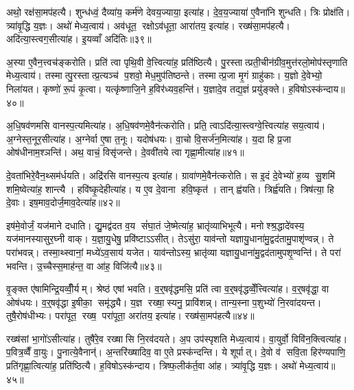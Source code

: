 अथो॒ रक्ष॑सा॒मप॑हत्यै। शुन्ध॑ध्वं॒ दैव्या॑य॒ कर्म॑णे देवय॒ज्याया॒ इत्या॑ह। दे॒व॒य॒ज्याया॑ ए॒वैना॑नि शुन्धति। त्रिः प्रोक्ष॑ति। त्र्या॑वृ॒द्धि य॒ज्ञः। अथो॑ मेध्य॒त्वाय॑। अव॑धूत॒ रक्षोऽव॑धूता॒ आरा॑तय॒ इत्या॑ह। रख्ष॑सा॒मप॑हत्यै। अदि॑त्या॒स्त्वग॒सीत्या॑ह। इ॒यव्वाँ अदि॑तिः॥३९॥

अ॒स्या ए॒वैन॒त्त्वच॑ङ्करोति। प्रति॑ त्वा पृथि॒वी वे॒त्त्वित्या॑ह॒ प्रति॑ष्ठित्यै। पु॒रस्तात्प्रती॒चीन॑ग्रीव॒मुत्त॑रलो॒मोप॑स्तृणाति मेध्य॒त्वाय॑। तस्मात्पु॒रस्तात्प्र॒त्यञ्च॑ प॒शवो॒ मेध॒मुप॑तिष्ठन्ते। तस्मात्प्र॒जा मृ॒गं ग्राहु॑काः। य॒ज्ञो दे॒वेभ्यो॒ निला॑यत। कृष्णो॑ रू॒पं कृ॒त्वा। यत्कृ॑ष्णाजि॒ने ह॒विर॑ध्यव॒हन्ति॑। य॒ज्ञादे॒व तद्य॒ज्ञं प्रयु॑ङ्क्ते। ह॒विषोऽस्क॑न्दाय॥४०॥

अ॒धि॒षव॑णमसि वानस्प॒त्यमित्या॑ह। अ॒धि॒षव॑णमे॒वैन॑त्करोति। प्रति॒ त्वाऽदि॑त्या॒स्त्वग्वे॒त्त्वित्या॑ह सय॒त्वाय॑। अ॒ग्नेस्त॒नूर॒सीत्या॑ह। अ॒ग्नेर्वा ए॒षा त॒नूः। यदोष॑धयः। वा॒चो वि॒सर्ज॑न॒मित्या॑ह। य॒दा हि प्र॒जा ओष॑धीनाम॒श्ञन्ति॑। अथ॒ वाचं॒ विसृ॑जन्ते। दे॒ववी॑तये त्वा गृह्णा॒मीत्या॑ह॥४१॥

दे॒वता॑भिरे॒वैन॒थ्सम॑र्धयति। अद्रि॑रसि वानस्प॒त्य इत्या॑ह। ग्रावा॑णमे॒वैन॑त्करोति। स इ॒दं दे॒वेभ्यो॑ ह॒व्य सु॒शमि॑ शमि॒ष्वेत्या॑ह॒ शान्त्यै। हवि॑ष्कृ॒देहीत्या॑ह। य ए॒व दे॒वाना हवि॒ष्कृत॑। तान्‌ ह्व॑यति। त्रिर्ह्व॑यति। त्रिष॑त्या॒ हि दे॒वाः। इष॒माव॒दोर्ज॒माव॒देत्या॑ह॥४२॥

इष॑मे॒वोर्जं॒ यज॑माने दधाति। द्यु॒मद्व॑दत व॒य सं॑घा॒तं जे॒ष्मेत्या॑ह॒ भ्रातृ॑व्याभिभूत्यै। मनोश्श्र॒द्धादे॑वस्य॒ यज॑मानस्यासुर॒घ्नी वाक्। य॒ज्ञा॒यु॒धेषु॒ प्रवि॑ष्टाऽऽसीत्। तेऽसु॑रा॒ याव॑न्तो यज्ञायु॒धाना॑मु॒द्वद॑तामु॒पाशृ॑ण्वन्न्। ते परा॑भवन्न्। तस्मा॒थ्स्वानां॒ मध्ये॑ऽव॒साय॑ यजेत। याव॑न्तोऽस्य॒ भ्रातृ॑व्या यज्ञायु॒धाना॑मु॒द्वद॑तामुपशृ॒ण्वन्ति॑। ते परा॑ भवन्ति। उ॒च्चैस्स॒माह॑न्त॒ वा आ॑ह॒ विजि॑त्यै॥४३॥

वृ॒ङ्क्त ए॑षामिन्द्रि॒यव्वीँ॒र्यम्। श्रेष्ठ॑ एषां भवति। व॒र्\mbox{}॒षवृ॑द्धमसि॒ प्रति॑ त्वा व॒र्\mbox{}॒षवृ॑द्धव्वेँ॒त्त्वित्या॑ह। व॒र्\mbox{}॒षवृ॑द्धा॒ वा ओष॑धयः। व॒र्\mbox{}॒षवृ॑द्धा इ॒षीका॒ समृ॑द्ध्यै। य॒ज्ञ रख्षा॒स्यनु॒ प्रावि॑शन्न्। तान्य॒स्ना प॒शुभ्यो॑ नि॒रवा॑दयन्त। तुषै॒रोष॑धीभ्यः। परा॑पूत॒ रख्ष॒ परा॑पूता॒ अरा॑तय॒ इत्या॑ह। रख्ष॑सा॒मप॑हत्यै॥४४॥

रख्ष॑सां भा॒गो॑ऽसीत्या॑ह। तुषै॑रे॒व रख्षासि नि॒रव॑दयते। अ॒प उप॑स्पृशति मेध्य॒त्वाय॑। वा॒युर्वो॒ विवि॑न॒क्त्वित्या॑ह। प॒वित्र॒व्वैँ वा॒युः। पु॒नात्ये॒वैनान्॑। अ॒न्तरि॑ख्षादिव॒ वा ए॒ते प्रस्क॑न्दन्ति। ये शूर्पात्। दे॒वो व॑ सवि॒ता हिर॑ण्यपाणि॒ प्रति॑गृह्णा॒त्वित्या॑ह॒ प्रति॑ष्ठित्यै। ह॒विषोऽस्क॑न्दाय। त्रिष्फ॒लीक॑र्त॒वा आ॑ह। त्र्या॑वृ॒द्धि य॒ज्ञः। अथो॑ मेध्य॒त्वाय॑॥४५॥\anuvakamend[द्वाभ्या॒मुत्पु॑नाति र॒श्मयो॑ नय॒न्त्यग्रे॑ य॒ज्ञप॑तिय्यँ॒ज्ञोऽदि॑ति॒रस्क॑न्दाय गृह्णा॒मीत्या॑ह व॒देत्या॑ह॒ विजि॑त्या॒ अप॑हत्या॒ अस्क॑न्दाय॒ त्रीणि॑ च]

